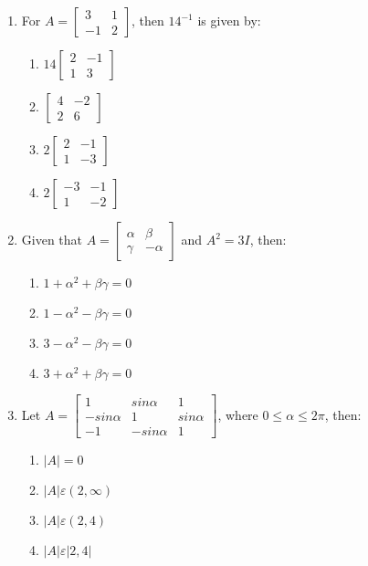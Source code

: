 \documentclass{article}
\begin{document}
\begin{enumerate}
    \item For $A = \begin{bmatrix}
        3 & 1\\
        -1 & 2
    \end{bmatrix}$, then $14^{{-}1}$ is given by:
    \begin{enumerate}
        \item $14 \begin{bmatrix}
            2 & -1\\
            1 & 3
        \end{bmatrix}$
        \item $\begin{bmatrix}
            4 & -2\\
            2 & 6
        \end{bmatrix}$
        \item $2 \begin{bmatrix}
            2 & -1\\
            1 & -3
        \end{bmatrix}$
        \item $2 \begin{bmatrix}
            -3 & -1\\
            1 & -2
        \end{bmatrix}$
    \end{enumerate}
    
    \item Given that $A = \begin{bmatrix}
        \alpha & \beta\\
        \gamma & -\alpha
    \end{bmatrix}$ and $A^2 = 3I$, then:
    \begin{enumerate}
        \item $1 + \alpha^2 + \beta\gamma = 0$
        \item $1 - \alpha^2 - \beta\gamma = 0$
        \item $3 - \alpha^2 - \beta\gamma = 0$
        \item $3 + \alpha^2 + \beta\gamma = 0$
    \end{enumerate}

    \item Let $A = \begin{bmatrix}
        1 & sin\alpha & 1\\
        -sin\alpha & 1 & sin\alpha\\
        -1 & -sin\alpha & 1
    \end{bmatrix}$, where $0 \leq \alpha \leq 2\pi$, then:
    \\
    \begin{enumerate}
        \item $|A|=0$
        \item $|A| \varepsilon (2,\infty)$
        \item $|A| \varepsilon (2,4)$
        \item $|A| \varepsilon |2,4|$
    \end{enumerate}
    
\end{enumerate}
\end{document}

